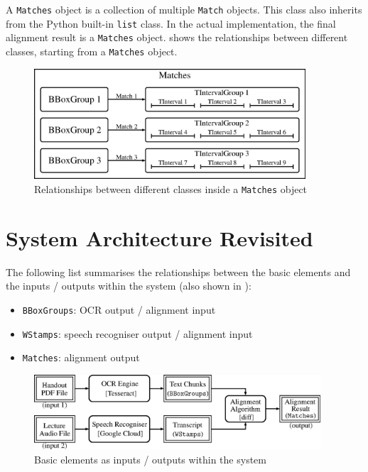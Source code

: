 A \texttt{Matches} object is a collection of multiple \texttt{Match} objects. This class also inherits from the Python built-in \texttt{list} class. In the actual implementation, the final alignment result is a \texttt{Matches} object.  shows the relationships between different classes, starting from a \texttt{Matches} object.

\begin{figure}[t]
    \centering
    \includegraphics[width=0.9\textwidth]{elem-matches.eps}
    \caption{Relationships between different classes inside a \texttt{Matches} object}
    \label{fig:elem-matches}
\end{figure}

\section{System Architecture Revisited}

The following list summarises the relationships between the basic elements and the inputs / outputs within the system (also shown in ):
\begin{itemize}
    \item \texttt{BBoxGroups}: OCR output / alignment input
    \item \texttt{WStamps}: speech recogniser output / alignment input
    \item \texttt{Matches}: alignment output
\end{itemize}

\begin{figure}[ht]
    \centering
    \includegraphics[width=0.95\textwidth]{elem-sys-diagram.eps}
    \caption{Basic elements as inputs / outputs within the system}
    \label{fig:elem-sys-diagram}
\end{figure}